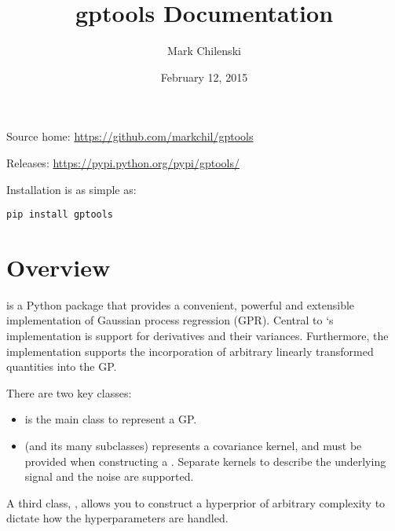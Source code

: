 \documentclass[letterpaper,10pt,english]{sphinxmanual}
\title{gptools Documentation}
\date{February 12, 2015}
\author{Mark Chilenski}
\begin{document}
\maketitle
\tableofcontents
{}\label{index::doc}


Source home: \href{https://github.com/markchil/gptools}{https://github.com/markchil/gptools}

Releases: \href{https://pypi.python.org/pypi/gptools/}{https://pypi.python.org/pypi/gptools/}

Installation is as simple as:

\begin{Verbatim}[commandchars=\\\{\}]
pip install gptools
\end{Verbatim}


\chapter{Overview}
\label{index:overview}\label{index:gptools-gaussian-process-regression-with-support-for-arbitrary-derivatives}
{\hyperref[gptools:module-gptools]{}} is a Python package that provides a convenient, powerful and extensible implementation of Gaussian process regression (GPR). Central to `s implementation is support for derivatives and their variances. Furthermore, the implementation supports the incorporation of arbitrary linearly transformed quantities into the GP.

There are two key classes:
\begin{itemize}
\item {} 
{\hyperref[gptools:gptools.gaussian_process.GaussianProcess]{}} is the main class to represent a GP.

\item {} 
{\hyperref[gptools.kernel:gptools.kernel.core.Kernel]{}} (and its many subclasses) represents a covariance kernel, and must be provided when constructing a {\hyperref[gptools:gptools.gaussian_process.GaussianProcess]{}}. Separate kernels to describe the underlying signal and the noise are supported.

\end{itemize}

A third class, {\hyperref[gptools:gptools.utils.JointPrior]{}}, allows you to construct a hyperprior of arbitrary complexity to dictate how the hyperparameters are handled.
\end{document}
